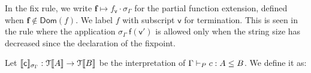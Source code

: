 \documentclass[a4paper,UKenglish,cleveref, autoref, thm-restate]{lipics-v2021}
\begin{document}
In the fix rule, we write $\mathbf{f} \mapsto f_{\mathsf{v}} \cdot \sigma_{\Gamma}$ for the partial function extension, defined when $\mathbf{f} \notin \mathsf{Dom}(f)$. We label $f$ with subscript $\mathsf{v}$ for termination. This is seen in the rule where the application $\sigma_{\Gamma}~\mathsf{f}(\mathsf{v'})$ is allowed only when the string size has decreased since the declaration of the fixpoint.
\begin{definition}[Interpretation]
Let $\llbracket \textsf{c} \rrbracket_{\sigma_{\Gamma}} : \mathcal{T}\llbracket A \rrbracket \rightarrow \mathcal{T}\llbracket B \rrbracket$ be the interpretation of $\containsG{c}{A}{B}$. We define it as:   
  \begin{displaymath}
    \begin{array}{l}

\end{array}
\end{displaymath}
\end{definition}
\end{document}
